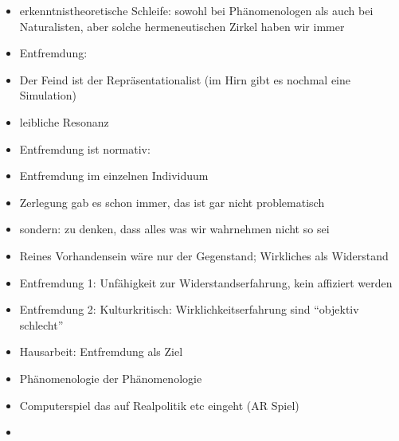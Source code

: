 \documentclass[emulatestandardclasses]{scrartcl}
\begin{document}
\begin{itemize}
  \item erkenntnistheoretische Schleife: sowohl bei Phänomenologen als auch bei Naturalisten, aber solche hermeneutischen Zirkel haben wir immer
  \item Entfremdung: 
  \item Der Feind ist der Repräsentationalist (im Hirn gibt es nochmal eine Simulation)
  \item leibliche Resonanz
  \item Entfremdung ist normativ:
  \item Entfremdung im einzelnen Individuum 
  \item Zerlegung gab es schon immer, das ist gar nicht problematisch
  \item sondern: zu denken, dass alles was wir wahrnehmen nicht so sei
  \item Reines Vorhandensein wäre nur der Gegenstand; Wirkliches als Widerstand
  \item Entfremdung 1: Unfähigkeit zur Widerstandserfahrung, kein affiziert werden
  \item Entfremdung 2: Kulturkritisch: Wirklichkeitserfahrung sind "`objektiv schlecht"'
\end{itemize}

\begin{itemize}
  \item Hausarbeit: Entfremdung als Ziel	
  \item Phänomenologie der Phänomenologie
  \item Computerspiel das auf Realpolitik etc eingeht (AR Spiel)
  \item 
  
\end{itemize}
\end{document}

